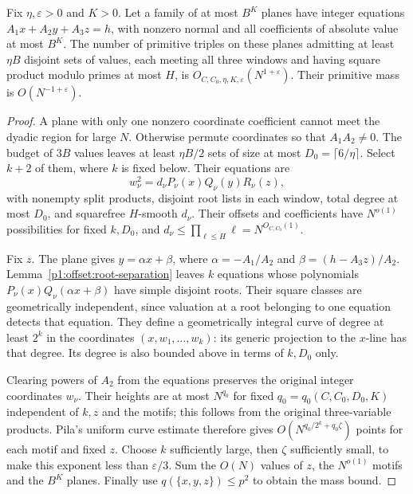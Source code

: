\begin{proposition}
\label{p1:offset:planar-components}
Fix $\eta,\varepsilon>0$ and $K>0$. Let a family of at most $B^K$
planes have integer equations
$A_1x+A_2y+A_3z=h$, with nonzero normal and all coefficients of
absolute value at most $B^K$.
The number of primitive triples on these planes admitting at least
$\eta B$ disjoint sets of values, each meeting all three windows and
having square product modulo primes at most $H$, is
$O_{C,C_0,\eta,K,\varepsilon}(N^{1+\varepsilon})$.
Their primitive mass is $O(N^{-1+\varepsilon})$.
\end{proposition}
\begin{proof}
A plane with only one nonzero coordinate coefficient cannot meet the
dyadic region for large $N$. Otherwise permute coordinates so that
$A_1A_2\ne0$. The budget of $3B$ values leaves at least $\eta B/2$
sets of size at most $D_0=\lceil6/\eta\rceil$.
Select $k+2$ of them, where $k$ is fixed below. Their equations are
\[
 w_\nu^2=d_\nu P_\nu(x)Q_\nu(y)R_\nu(z),
\]
with nonempty split products, disjoint root lists in each window,
total degree at most $D_0$, and squarefree $H$-smooth $d_\nu$.
Their offsets and coefficients have $N^{o(1)}$ possibilities for fixed
$k,D_0$, and $d_\nu\le\prod_{\ell\le H}\ell=N^{O_{C,C_0}(1)}$.

Fix $z$. The plane gives
$y=\alpha x+\beta$, where
$\alpha=-A_1/A_2$ and $\beta=(h-A_3z)/A_2$.
Lemma~\ref{p1:offset:root-separation} leaves $k$ equations whose
polynomials $P_\nu(x)Q_\nu(\alpha x+\beta)$ have simple disjoint
roots. Their square classes are geometrically independent, since
valuation at a root belonging to one equation detects that equation.
They define a geometrically integral curve of degree at least $2^k$
in the coordinates $(x,w_1,\ldots,w_k)$: its generic projection to
the $x$-line has that degree. Its degree is also bounded above in terms
of $k,D_0$ only.

Clearing powers of $A_2$ from the equations preserves the original
integer coordinates $w_\nu$. Their heights are at most $N^{q_0}$
for fixed $q_0=q_0(C,C_0,D_0,K)$ independent of $k,z$ and the motifs;
this follows from the original three-variable products.
Pila's uniform curve estimate \cite[Theorem~A]{pila1995} therefore
gives $O(N^{q_0/2^k+q_0\zeta})$ points for each motif and fixed $z$.
Choose $k$ sufficiently large, then $\zeta$ sufficiently small, to
make this exponent less than $\varepsilon/3$. Sum the $O(N)$ values
of $z$, the $N^{o(1)}$ motifs and the $B^K$ planes. Finally use
$q(\{x,y,z\})\le p^2$ to obtain the mass bound.
\end{proof}

